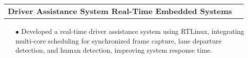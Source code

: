 \documentclass[11pt]{article}
\makeatletter
\newcommand{\resumeSubheadingP}[2]{
  \vspace{-2pt}\item
    \begin{tabular*}{1.0\textwidth}[t]{l@{\extracolsep{\fill}}r}
       \textbf{{\large #1}}&{#2} \\
    \end{tabular*}\vspace{-1pt}
}
\makeatother
\begin{document}
\resumeSubheadingP
{Driver Assistance System \textbar{ } Real-Time Embedded Systems }{}
\begin{itemize}[leftmargin=0.3in]\setlength{\itemsep}{0pt}\setlength{\parskip}{0pt}\vspace{-0.2cm}
  \item[$\bullet$] Developed a real-time driver assistance system using RTLinux, integrating multi-core scheduling for synchronized frame capture, lane departure detection, and human detection, improving system response time.
\end{itemize}
\vspace{-0.2cm}

%






\end{document}
